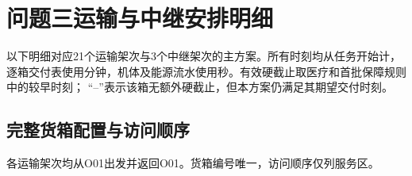 \begingroup
\captionsetup{font=small,skip=4pt}
\section{问题三运输与中继安排明细}
\label{app:q3-details}
以下明细对应21个运输架次与3个中继架次的主方案。所有时刻均从任务开始计，
逐箱交付表使用分钟，机体及能源流水使用秒。有效硬截止取医疗和首批保障规则中的较早时刻；
“--”表示该箱无额外硬截止，但本方案仍满足其期望交付时刻。

\subsection{完整货箱配置与访问顺序}
各运输架次均从O01出发并返回O01。货箱编号唯一，访问顺序仅列服务区。
\begingroup
\small
\setlength{\tabcolsep}{3pt}
\renewcommand{\arraystretch}{1.10}
